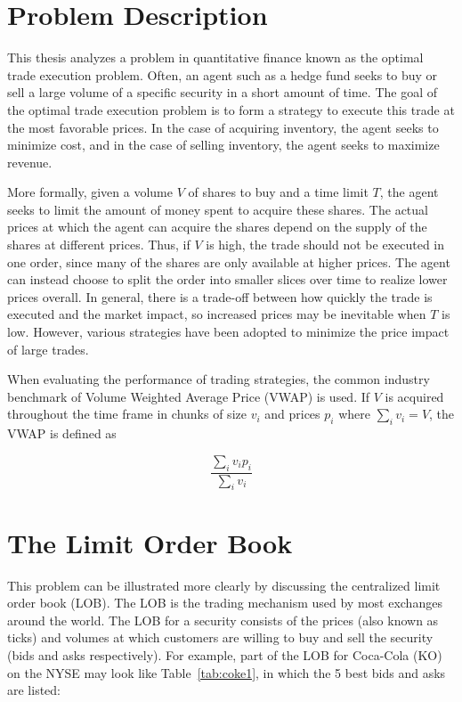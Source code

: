 \section{Problem Description} \label{ch:problemdescription}

This thesis analyzes a problem in quantitative finance known as the optimal trade execution problem. Often, an agent such as a hedge fund seeks to buy or sell a large volume of a specific security in a short amount of time. The goal of the optimal trade execution problem is to form a strategy to execute this trade at the most favorable prices. In the case of acquiring inventory, the agent seeks to minimize cost, and in the case of selling inventory, the agent seeks to maximize revenue.

More formally, given a volume $V$ of shares to buy and a time limit $T$, the agent seeks to limit the amount of money spent to acquire these shares. The actual prices at which the agent can acquire the shares depend on the supply of the shares at different prices. Thus, if $V$ is high, the trade should not be executed in one order, since many of the shares are only available at higher prices. The agent can instead choose to split the order into smaller slices over time to realize lower prices overall. In general, there is a trade-off between how quickly the trade is executed and the market impact, so increased prices may be inevitable when $T$ is low. However, various strategies have been adopted to minimize the price impact of large trades.

When evaluating the performance of trading strategies, the common industry benchmark of Volume Weighted Average Price (VWAP) is used. If $V$ is acquired throughout the time frame in chunks of size $v_i$ and prices $p_i$ where $\sum\limits_i{v_i} = V$, the VWAP is defined as 

$$ \frac{\sum\limits_i{v_i p_i}}{\sum\limits_i{v_i}}$$

\section{The Limit Order Book} \label{ch:background}
This problem can be illustrated more clearly by discussing the centralized limit order book (LOB). The LOB is the trading mechanism used by most exchanges around the world. The LOB for a security consists of the prices (also known as ticks) and volumes at which customers are willing to buy and sell the security (bids and asks respectively). For example, part of the LOB for Coca-Cola (KO) on the NYSE may look like Table~\ref{tab:coke1}, in which the 5 best bids and asks are listed:

